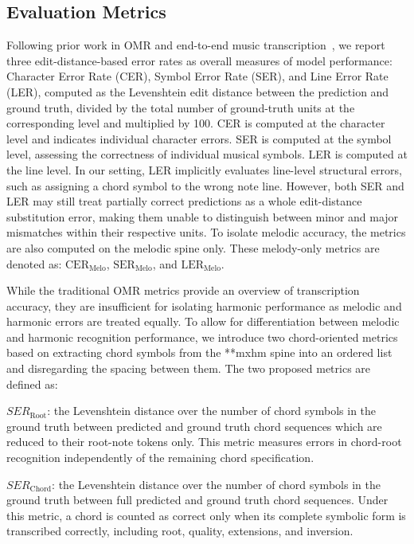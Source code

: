 \documentclass{article}
\begin{document}
\subsection{Evaluation Metrics}
\label{sec:metrics}
Following prior work in OMR and end-to-end music transcription~\cite{calvo-zaragoza_understanding_2021, rios-vila_sheet_2024, martinez-sevilla_optical_2025, RiosVila2026FullPageOMR}, we report three edit-distance-based error rates as overall measures of model performance: Character Error Rate (CER), Symbol Error Rate (SER), and Line Error Rate (LER), computed as the Levenshtein edit distance between the prediction and ground truth, divided by the total number of ground-truth units at the corresponding level and multiplied by 100. CER is computed at the character level and indicates individual character errors. SER is computed at the symbol level, assessing the correctness of individual musical symbols. LER is computed at the line level. In our setting, LER implicitly evaluates line-level structural errors, such as assigning a chord symbol to the wrong note line. However, both SER and LER may still treat partially correct predictions as a whole edit-distance substitution error, making them unable to distinguish between minor and major mismatches within their respective units. To isolate melodic accuracy, the metrics are also computed on the melodic spine only. These melody-only metrics are denoted as: %
$\mathrm{CER}_{\mathrm{Melo}}$, $\mathrm{SER}_{\mathrm{Melo}}$, and $\mathrm{LER}_{\mathrm{Melo}}$.

While the traditional OMR metrics provide an overview of transcription accuracy, they are insufficient for isolating harmonic performance as melodic and harmonic errors are treated equally. To allow for differentiation between melodic and harmonic recognition performance, we introduce two chord-oriented metrics based on extracting chord symbols from the **mxhm spine into an ordered list and disregarding the spacing between them. 
The two proposed metrics are defined as:

\begin{compactitem}
\item $SER_\mathrm{Root}$: the Levenshtein distance over the number of chord symbols in the ground truth between predicted and ground truth chord sequences which are reduced to their root-note tokens only. This metric measures errors in chord-root recognition independently of the remaining chord specification.

\item $SER_\mathrm{Chord}$: the Levenshtein distance over the number of chord symbols in the ground truth between full predicted and ground truth chord sequences. Under this metric, a chord is counted as correct only when its complete symbolic form is transcribed correctly, including root, quality, extensions, and inversion.
\end{compactitem}
\end{document}
